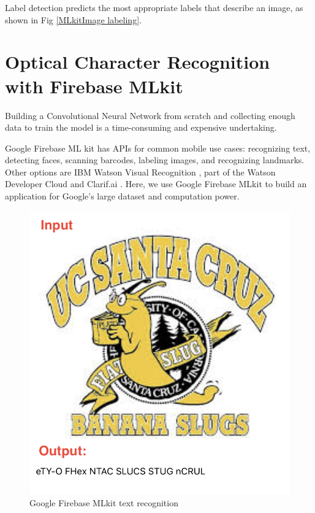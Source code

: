 \documentclass[11pt]{ucscthesis}
\begin{document}
Label detection\cite{MLImageLable} predicts the most appropriate labels that describe an image, as shown in Fig \ref{MLkitImage labeling}.


\section{Optical Character Recognition with Firebase MLkit}
Building a Convolutional Neural Network from scratch and collecting enough data \cite{GoogleDatasets} to train the model is a time-consuming and expensive undertaking. 

Google Firebase ML kit \cite{GoogleMLkit} has APIs for common mobile use cases: recognizing text, detecting faces, scanning barcodes, labeling images, and recognizing landmarks. Other options are IBM Watson Visual Recognition \cite{IBMclassifier}, part of the Watson Developer Cloud and Clarif.ai \cite{clarif}. Here, we use Google Firebase MLkit to build an application for Google's large dataset and computation power.

\begin{figure}
    \centering
    \includegraphics[width =0.4\linewidth]{Fig/OCRdemo.png}
    \caption{Google Firebase MLkit text recognition}
    \label{MLkitOCR}
\end{figure}
\end{document}
